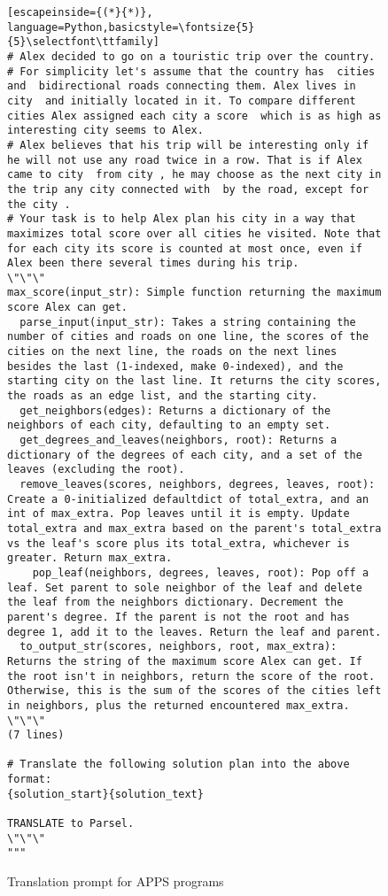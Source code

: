 \begin{figure*}[h]
\begin{lstlisting}[escapeinside={(*}{*)}, language=Python,basicstyle=\fontsize{5}{5}\selectfont\ttfamily]
# Alex decided to go on a touristic trip over the country.
# For simplicity let's assume that the country has  cities and  bidirectional roads connecting them. Alex lives in city  and initially located in it. To compare different cities Alex assigned each city a score  which is as high as interesting city seems to Alex.
# Alex believes that his trip will be interesting only if he will not use any road twice in a row. That is if Alex came to city  from city , he may choose as the next city in the trip any city connected with  by the road, except for the city .
# Your task is to help Alex plan his city in a way that maximizes total score over all cities he visited. Note that for each city its score is counted at most once, even if Alex been there several times during his trip.
\"\"\"
max_score(input_str): Simple function returning the maximum score Alex can get.
  parse_input(input_str): Takes a string containing the number of cities and roads on one line, the scores of the cities on the next line, the roads on the next lines besides the last (1-indexed, make 0-indexed), and the starting city on the last line. It returns the city scores, the roads as an edge list, and the starting city.
  get_neighbors(edges): Returns a dictionary of the neighbors of each city, defaulting to an empty set.
  get_degrees_and_leaves(neighbors, root): Returns a dictionary of the degrees of each city, and a set of the leaves (excluding the root).
  remove_leaves(scores, neighbors, degrees, leaves, root): Create a 0-initialized defaultdict of total_extra, and an int of max_extra. Pop leaves until it is empty. Update total_extra and max_extra based on the parent's total_extra vs the leaf's score plus its total_extra, whichever is greater. Return max_extra.
    pop_leaf(neighbors, degrees, leaves, root): Pop off a leaf. Set parent to sole neighbor of the leaf and delete the leaf from the neighbors dictionary. Decrement the parent's degree. If the parent is not the root and has degree 1, add it to the leaves. Return the leaf and parent.
  to_output_str(scores, neighbors, root, max_extra): Returns the string of the maximum score Alex can get. If the root isn't in neighbors, return the score of the root. Otherwise, this is the sum of the scores of the cities left in neighbors, plus the returned encountered max_extra.
\"\"\"
(7 lines)

# Translate the following solution plan into the above format:
{solution_start}{solution_text}

TRANSLATE to Parsel.
\"\"\"
"""
\end{lstlisting} 
\caption{Translation prompt for APPS programs}
\end{figure*}

